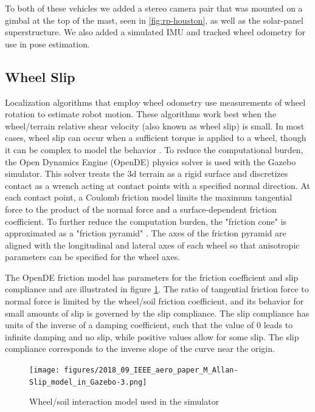 \documentclass[twocolumn,letterpaper]{IEEEAerospaceCLS}  %
\begin{document}
To both of these vehicles we added a stereo camera pair that was mounted on a gimbal at the top of the mast, seen in \cref{fig:rp-houston}, as well as the solar-panel superstructure. We also added a simulated IMU and tracked wheel odometry for use in pose estimation.  

\subsection{Wheel Slip}
Localization algorithms that employ wheel odometry use measurements of wheel rotation to estimate robot motion.
These algorithms work best when the wheel/terrain relative shear velocity (also known as wheel slip) is small.
In most cases, wheel slip can occur when a sufficient torque is applied to a wheel,
though it can be complex to model the behavior \cite{yoshida1013712}.
To reduce the computational burden, the Open Dynamics Engine (OpenDE) physics solver is used with the Gazebo simulator.
This solver treats the 3d terrain as a rigid surface and discretizes contact as a wrench
acting at contact points with a specified normal direction.
At each contact point, a Coulomb friction model limits the maximum tangential force
to the product of the normal force and a surface-dependent friction coefficient.
To further reduce the computation burden, the "friction cone" is approximated
as a "friction pyramid" \cite{hsuPeters2014}.
The axes of the friction pyramid are aligned with the longitudinal and lateral axes of each wheel
so that anisotropic parameters can be specified for the wheel axes.

The OpenDE friction model has parameters for the friction coefficient and slip compliance
and are illustrated in figure \ref{fig:wheelsoilmodel}.
The ratio of tangential friction force to normal force is limited by the wheel/soil friction coefficient,
and its behavior for small amounts of slip is governed by the slip compliance.
The slip compliance has units of the inverse of a damping coefficient,
such that the value of 0 leads to infinite damping and no slip,
while positive values allow for some slip.
The slip compliance corresponds to the inverse slope of the curve near the origin.

\begin{figure}[h!]
    \texttt{[image: figures/2018\_09\_IEEE\_aero\_paper\_M\_Allan-Slip\_model\_in\_Gazebo-3.png]}
    \caption{Wheel/soil interaction model used in the simulator}
    \label{fig:wheelsoilmodel}
\end{figure}
\end{document}

